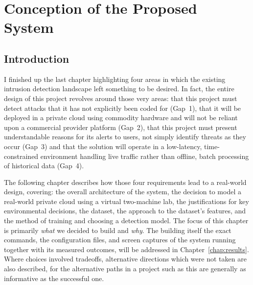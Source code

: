 
\chapter{Conception of the Proposed System}
\label{chap:conception}

\section{Introduction}
\label{sec:conception_intro}

I finished up the last chapter highlighting four areas in which the existing intrusion detection landscape left something to be desired. In fact, the entire design of this project revolves around those very areas: that this project must detect attacks that it has not explicitly been coded for (Gap~1), that it will be deployed in a private cloud using commodity hardware and will not be reliant upon a commercial provider platform (Gap~2), that this project must present understandable reasons for its alerts to users, not simply identify threats as they occur (Gap~3) and that the solution will operate in a low-latency, time-constrained environment handling live traffic rather than offline, batch processing of historical data (Gap~4).

The following chapter describes how those four requirements lead to a real-world design, covering: the overall architecture of the system, the decision to model a real-world private cloud using a virtual two-machine lab, the justifications for key environmental decisions, the dataset, the approach to the dataset's features, and the method of training and choosing a detection model. The focus of this chapter is primarily \emph{what} we decided to build and \emph{why}. The building itself the exact commands, the configuration files, and screen captures of the system running  together with its measured outcomes, will be addressed in Chapter~\ref{chap:results}. Where choices involved tradeoffs, alternative directions which were not taken are also described, for the alternative paths in a project such as this are generally as informative as the successful one.

